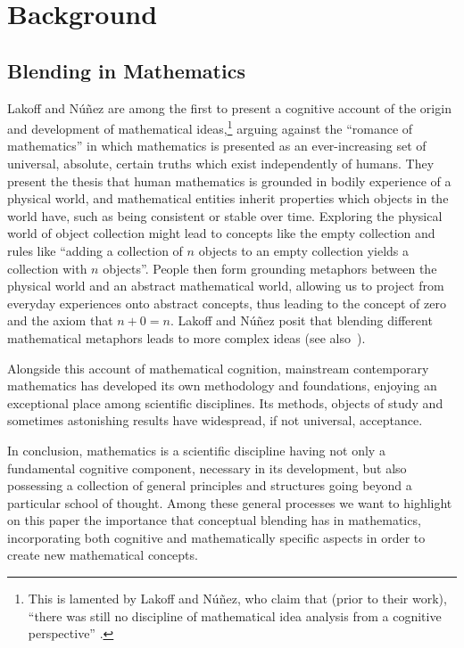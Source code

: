 \section{Background}
\label{sec:background}

\subsection{Blending in Mathematics}
\label{subsec:mathblend}

Lakoff and N{\'u}{\~n}ez \citep{Lak00} are among the first to present
a cognitive account of the origin and development of mathematical
ideas,\footnote{This is lamented by Lakoff and N{\'u}{\~n}ez, who
claim that (prior to their work), ``there was still no discipline of
mathematical idea analysis from a cognitive perspective''
\citep{Lak00}.} arguing against the ``romance of mathematics'' in which
mathematics is presented as an ever-increasing set of universal,
absolute, certain truths which exist independently of humans. They
present the thesis that human mathematics is grounded in bodily
experience of a physical world, and mathematical entities inherit
properties which objects in the world have, such as being consistent
or stable over time.  Exploring the physical world of object
collection might lead to concepts like the empty collection and rules
like ``adding a collection of $n$ objects to an empty collection
yields a collection with $n$ objects''. People then form grounding
metaphors between the physical world and an abstract mathematical
world, allowing us to project from everyday experiences onto abstract
concepts, thus leading to the concept of zero and the axiom that $n +
0 = n$. Lakoff and N{\'u}{\~n}ez posit that blending different
mathematical metaphors leads to more complex ideas (see
also~\textcite{Al11i}). 

Alongside this account of mathematical cognition, mainstream
contemporary mathematics has developed its own methodology and
foundations, enjoying an exceptional place among scientific
disciplines. Its methods, objects of study and sometimes astonishing
results have widespread, if not universal, acceptance.

In conclusion, mathematics is a scientific discipline having not only
a fundamental cognitive component, necessary in its development, but
also possessing a collection of general principles and structures
going beyond a particular school of thought.  Among these general
processes we want to highlight on this paper the importance that
conceptual blending has in mathematics, incorporating both cognitive and
mathematically specific aspects in order to create new mathematical concepts.



